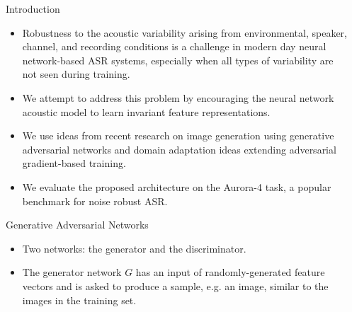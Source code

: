 \documentclass[final]{beamer}
\newlength{\sepwid}
\newlength{\onecolwid}
\begin{document}
\begin{frame}[t] %

\begin{columns}[t] %

\begin{column}{\sepwid}\end{column} %

\begin{column}{\onecolwid} %


\begin{block}{Introduction}
    \begin{itemize}
        \item 
            \textcolor{dblue}{Robustness} to the acoustic variability arising from environmental, speaker, channel, 
    and recording 
    conditions is a challenge in modern day 
    neural network-based ASR systems, especially when all types of variability are 
    not seen during training. 
    
        \item We attempt to address this problem by encouraging the 
            neural network acoustic model to learn \textcolor{dblue}{invariant} feature representations.
        
        \item We use ideas from recent research on image generation using
            \textcolor{dblue}{generative adversarial networks} and domain adaptation ideas extending
    adversarial gradient-based training.  
        \item We evaluate the proposed 
    architecture on the Aurora-4 task, a popular benchmark for
    noise robust ASR. 
    \end{itemize}

\end{block}



\begin{block}{Generative Adversarial Networks}
    \begin{itemize}
        \item Two networks: the \textcolor{dblue}{generator} and the \textcolor{dblue}{discriminator}.
        \item The generator network $G$ has an
    input of randomly-generated feature vectors and is asked to produce a sample, e.g. an image, 
    similar to the images in the training set. 
    

\end{itemize}
\end{block}
\end{column}
\end{columns}
\end{frame}
\end{document}
